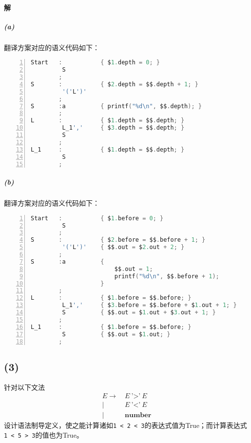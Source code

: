 \documentclass{article}
\begin{document}
\paragraph{解}
\subparagraph{(a)}
翻译方案对应的语义代码如下：
\begin{lstlisting}[language = C,
    numbers=left,
    numberstyle=\small,
    keywordstyle=\bfseries\color{blue!70},
    commentstyle=\color{red!40!green!60!blue},
    frame=shadowbox,
    rulesepcolor=\color{red!20!green!30!blue!20},
    basicstyle=\ttfamily,
    breaklines,
    columns = fixed,
    escapeinside=``]
Start   :           { $1.depth = 0; }
         S
        ;
S       :           { $2.depth = $$.depth + 1; }
         '('L')'
        ;
S       :a          { printf("%d\n", $$.depth); }
        ;
L       :           { $1.depth = $$.depth; }
         L_1','     { $3.depth = $$.depth; }
         S
        ;
L_1     :           { $1.depth = $$.depth; }
         S
        ;
\end{lstlisting}
\subparagraph{(b)}
翻译方案对应的语义代码如下：
\begin{lstlisting}[language = C,
    numbers=left,
    numberstyle=\small,
    keywordstyle=\bfseries\color{blue!70},
    commentstyle=\color{red!40!green!60!blue},
    frame=shadowbox,
    rulesepcolor=\color{red!20!green!30!blue!20},
    basicstyle=\ttfamily,
    breaklines,
    columns = fixed,
    escapeinside=``]
Start   :           { $1.before = 0; }
         S
        ;
S       :           { $2.before = $$.before + 1; }
         '('L')'    { $$.out = $2.out + 2; }
        ;
S       :a          {
                        $$.out = 1;
                        printf("%d\n", $$.before + 1);
                    }
        ;
L       :           { $1.before = $$.before; }
         L_1','     { $3.before = $$.before + $1.out + 1; }
         S          { $$.out = $1.out + $3.out + 1; }
        ;
L_1     :           { $1.before = $$.before; }
         S          { $$.out = $1.out; }
        ;
\end{lstlisting}
\subsection*{(3)}
针对以下文法
\begin{align*}
    E \rightarrow &\ E\ \texttt{'>'}\ E \\
    |&\  E\ \texttt{'<'}\ E \\
    |&\  \textbf{number}
\end{align*}
设计语法制导定义，使之能计算诸如\texttt{1 < 2 < 3}的表达式值为True；而计算表达式\texttt{1 < 5 > 3}的值也为True。
\end{document}
